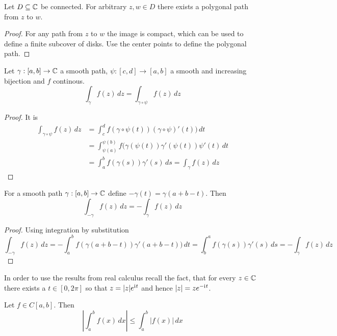 \begin{lemma}
	Let \( D \subseteq \mathbb{C} \) be connected. For arbitrary \( z, w \in D \) there exists a polygonal path from
	\( z \) to \( w \).
\end{lemma}
\begin{proof}
	For any path from \( z \) to \( w \) the image is compact, which can be used to define a finite subcover of disks.
	Use the center points to define the polygonal path.
\end{proof}
\bigskip


\begin{lemma}
	Let \( \gamma: [a,b] \to \mathbb{C} \) a smooth path, \( \psi: [c,d] \to [a,b] \) a smooth and increasing bijection
	and \( f \) continous.
	\[
		\int_{\gamma} f(z)\,dz = \int_{\gamma\circ\psi} f(z)\,dz
	\]
\end{lemma}

\begin{proof} It is
	\[
		\begin{split}
			\int_{\gamma\circ\psi} f(z)\,dz
			& = \int_c^d f(\gamma\circ\psi(t))(\gamma\circ\psi)'(t)) \,dt \\
			& = \int_{\psi(a)}^{\psi(b)} f(\gamma(\psi(t))\gamma'(\psi(t))\psi'(t) \,dt \\
			& = \int_a^b f(\gamma(s))\gamma'(s) \,ds = \int_{\gamma} f(z)\,dz
		\end{split}
	\]
\end{proof}
\bigskip


\begin{lemma}
	For a smooth path \( \gamma: [a,b] \to \mathbb{C} \) define \(-\gamma(t) = \gamma(a + b - t) \).
	Then
	\[
		\int_{-\gamma} f(z)\,dz = -\int_{\gamma} f(z)\,dz
	\]
\end{lemma}

\begin{proof} Using integration by substitution
	\[
		\int_{-\gamma} f(z)\,dz
		= - \int_a^b f(\gamma(a + b - t))\gamma'(a + b - t)) \,dt
		= \int_b^a f(\gamma(s))\gamma'(s) \,ds
		= - \int_{\gamma} f(z)\,dz
	\]
\end{proof}
\bigskip


In order to use the results from real calculus recall the fact, that for every \( z \in \mathbb{C} \)
there exists a \( t \in [0,2\pi] \) so that \( z = |z|e^{\mathrm{i}\mkern1mu t} \) and hence \( |z| = ze^{-\mathrm{i}\mkern1mu t} \).
\bigskip


\begin{lemma}
	Let \( f \in C[a,b] \). Then
	\[
		\left|\int_a^b f(x)\,dx \right| \le \int_a^b |f(x)|\,dx
	\]
\end{lemma}

